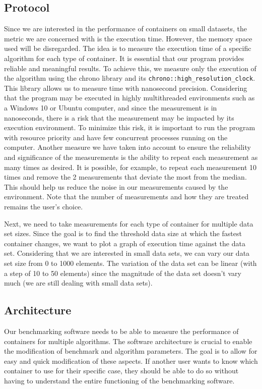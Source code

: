 \documentclass[conference]{IEEEtran}
\def\code#1{\texttt{#1}}
\begin{document}
\subsection{Protocol}

Since we are interested in the performance of containers on small datasets, the metric we are concerned with is the execution time. However, the memory space used will be disregarded. The idea is to measure the execution time of a specific algorithm for each type of container. It is essential that our program provides reliable and meaningful results. To achieve this, we measure only the execution of the algorithm using the chrono library and its \code{chrono::high\_resolution\_clock}. This library allows us to measure time with nanosecond precision. Considering that the program may be executed in highly multithreaded environments such as a Windows 10 or Ubuntu computer, and since the measurement is in nanoseconds, there is a risk that the measurement may be impacted by its execution environment. To minimize this risk, it is important to run the program with resource priority and have few concurrent processes running on the computer. Another measure we have taken into account to ensure the reliability and significance of the measurements is the ability to repeat each measurement as many times as desired. It is possible, for example, to repeat each measurement 10 times and remove the 2 measurements that deviate the most from the median. This should help us reduce the noise in our measurements caused by the environment. Note that the number of measurements and how they are treated remains the user's choice.

Next, we need to take measurements for each type of container for multiple data set sizes. Since the goal is to find the threshold data size at which the fastest container changes, we want to plot a graph of execution time against the data set. Considering that we are interested in small data sets, we can vary our data set size from 0 to 1000 elements. The variation of the data set can be linear (with a step of 10 to 50 elements) since the magnitude of the data set doesn't vary much (we are still dealing with small data sets).

\subsection{Architecture}

Our benchmarking software needs to be able to measure the performance of containers for multiple algorithms. The software architecture is crucial to enable the modification of benchmark and algorithm parameters. The goal is to allow for easy and quick modification of these aspects. If another user wants to know which container to use for their specific case, they should be able to do so without having to understand the entire functioning of the benchmarking software.
\end{document}
